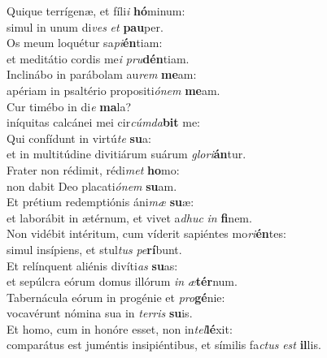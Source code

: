 \evenverse Quique terrígenæ, et fíli\textit{i} \textbf{hó}minum:~\*\\
\evenverse simul in unum di\textit{ves} \textit{et} \textbf{pau}per.\\
\oddverse Os meum loquétur sa\textit{pi}\textbf{én}tiam:~\*\\
\oddverse et meditátio cordis me\textit{i} \textit{pru}\textbf{dén}tiam.\\
\evenverse Inclinábo in parábolam au\textit{rem} \textbf{me}am:~\*\\
\evenverse apériam in psaltério propositi\textit{ó}\textit{nem} \textbf{me}am.\\
\oddverse Cur timébo in di\textit{e} \textbf{ma}la?~\*\\
\oddverse iníquitas calcánei mei cir\textit{cúm}\textit{da}\textbf{bit} me:\\
\evenverse Qui confídunt in virtú\textit{te} \textbf{su}a:~\*\\
\evenverse et in multitúdine divitiárum suárum \textit{glo}\textit{ri}\textbf{án}tur.\\
\oddverse Frater non rédimit, rédi\textit{met} \textbf{ho}mo:~\*\\
\oddverse non dabit Deo placati\textit{ó}\textit{nem} \textbf{su}am.\\
\evenverse Et prétium redemptiónis áni\textit{mæ} \textbf{su}æ:~\*\\
\evenverse et laborábit in ætérnum, et vivet a\textit{dhuc} \textit{in} \textbf{fi}nem.\\
\oddverse Non vidébit intéritum, cum víderit sapiéntes mo\textit{ri}\textbf{én}tes:~\*\\
\oddverse simul insípiens, et stul\textit{tus} \textit{pe}\textbf{rí}bunt.\\
\evenverse Et relínquent aliénis divíti\textit{as} \textbf{su}as:~\*\\
\evenverse et sepúlcra eórum domus illórum \textit{in} \textit{æ}\textbf{tér}num.\\
\oddverse Tabernácula eórum in progénie et \textit{pro}\textbf{gé}nie:~\*\\
\oddverse vocavérunt nómina sua in \textit{ter}\textit{ris} \textbf{su}is.\\
\evenverse Et homo, cum in honóre esset, non in\textit{tel}\textbf{lé}xit:~\*\\
\evenverse comparátus est juméntis insipiéntibus, et símilis fa\textit{ctus} \textit{est} \textbf{il}lis.\\
